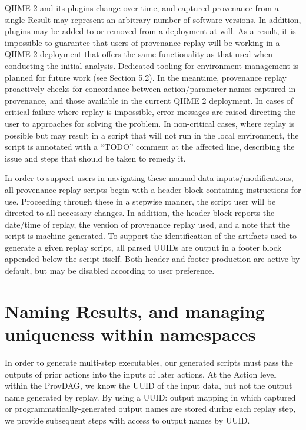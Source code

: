 QIIME 2 and its plugins change over time, and captured provenance from a single
Result may represent an arbitrary number of software versions. In addition,
plugins may be added to or removed from a deployment at will. As a result, it is
impossible to guarantee that users of provenance replay will be working in a
QIIME 2 deployment that offers the same functionality as that used when
conducting the initial analysis. Dedicated tooling for environment management is
planned for future work (see Section 5.2). In the meantime, provenance replay
proactively checks for concordance between action/parameter names captured in
provenance, and those available in the current QIIME 2 deployment. In cases of
critical failure where replay is impossible, error messages are raised directing
the user to approaches for solving the problem. In non-critical cases, where
replay is possible but may result in a script that will not run in the local
environment, the script is annotated with a “TODO” comment at the affected line,
describing the issue and steps that should be taken to remedy it.

In order to support users in navigating these manual data inputs/modifications,
all provenance replay scripts begin with a header block containing instructions
for use. Proceeding through these in a stepwise manner, the script user will be
directed to all necessary changes. In addition, the header block reports the
date/time of replay, the version of provenance replay used, and a note that the
script is machine-generated. To support the identification of the artifacts used
to generate a given replay script, all parsed UUIDs are output in a footer block
appended below the script itself. Both header and footer production are active
by default, but may be disabled according to user preference.



\section{Naming Results, and managing uniqueness within namespaces}

In order to generate multi-step executables, our generated scripts must pass the
outputs of prior actions into the inputs of later actions. At the Action level
within the ProvDAG, we know the UUID of the input data, but not the output name
generated by replay. By using a {UUID: output} mapping in which captured or
programmatically-generated output names are stored during each replay step, we
provide subsequent steps with access to output names by UUID.

